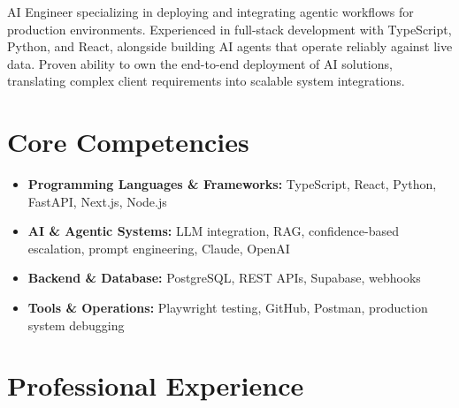 \documentclass[11pt,a4paper,sans]{moderncv}
\begin{document}
\makecvtitle

AI Engineer specializing in deploying and integrating agentic workflows for production environments. Experienced in full-stack development with TypeScript, Python, and React, alongside building AI agents that operate reliably against live data. Proven ability to own the end-to-end deployment of AI solutions, translating complex client requirements into scalable system integrations.

\vspace{3pt}
\section{Core Competencies}
\begin{itemize}
\item \textbf{Programming Languages \& Frameworks:} TypeScript, React, Python, FastAPI, Next.js, Node.js
\item \textbf{AI \& Agentic Systems:} LLM integration, RAG, confidence-based escalation, prompt engineering, Claude, OpenAI
\item \textbf{Backend \& Database:} PostgreSQL, REST APIs, Supabase, webhooks
\item \textbf{Tools \& Operations:} Playwright testing, GitHub, Postman, production system debugging
\end{itemize}

\section{Professional Experience}
\vspace{1pt}
\end{document}
